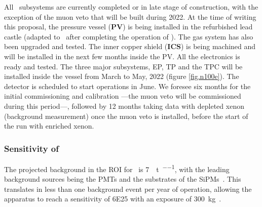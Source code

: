 All \Next\ subsystems are currently completed or in late stage of construction, with the exception of the muon veto that will be built during 2022. At the time of writing this proposal, the pressure vessel ({\bf PV}) is being installed in the refurbished lead castle (adapted to \Next\ after completing the operation of \NEW). The gas system has also been upgraded and tested. The inner copper shield  ({\bf ICS}) is being machined and will be installed in the next few months inside the PV. All the electronics is ready and tested. The three major subsystems, EP, TP and the TPC will be installed inside the vessel from March to May, 2022 (figure \ref{fig.n100e}). The detector is scheduled to start operations in June. We foresee six months for the initial commissioning and calibration ---the muon veto will be commissioned during this period---, followed by 12 months taking data with depleted xenon (background measurement) once the muon veto is installed, before the start of the run with enriched xenon. 


\subsubsection{Sensitivity of \Next}

The projected background in the ROI for \Next\ is \SI{7}{\ev\per\tonne\per\yr}, with the leading background sources being the PMTs and the substrates of the SiPMs~\cite{Martin-Albo:2015rhw}.  This translates in less than one background event per year of operation, allowing the apparatus to reach 
a sensitivity of \SI{6E25}{\yr} with an exposure of \SI{300}{\kg\yr}. 


